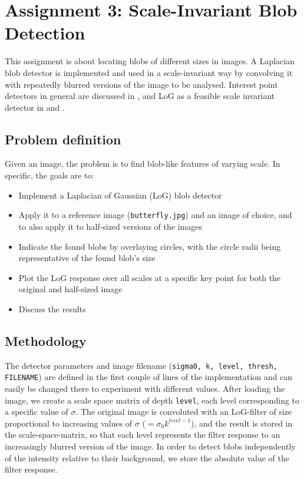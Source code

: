 \section{Assignment 3: Scale-Invariant Blob Detection}
\label{sec:assignment3}

This assignment is about locating blobs of different sizes in images. A Laplacian blob detector is implemented and used in a scale-invariant way by convolving it with repeatedly blurred versions of the image to be analysed.
Interest point detectors in general are discussed in \cite{Szeliski}, and LoG as a feasible scale invariant detector in \cite{Lindeberg} and \cite{Mikolajczyk}.

\subsection{Problem definition}

Given an image, the problem is to find blob-like features of varying scale. In specific, the goals are to:
\begin{itemize}[noitemsep]
\item Implement a Laplacian of Gaussian (LoG) blob detector
\item Apply it to a reference image (\texttt{butterfly.jpg}) and an image of choice, and to also apply it to half-sized versions of the images
\item Indicate the found blobs by overlaying circles, with the circle radii being representative of the found blob's size
\item Plot the LoG response over all scales at a specific key point for both the original and half-sized image
\item Discuss the results
\end{itemize}

\subsection{Methodology}
\label{sec:a3:methodology}

The detector parameters and image filename (\texttt{sigma0, k, level, thresh, FILENAME}) are defined in the first couple of lines of the implementation and can easily be changed there to experiment with different values.
After loading the image, we create a scale space matrix of depth \texttt{level}, each level corresponding to a specific value of $\sigma$.
The original image is convoluted with an LoG-filter of size proportional to increasing values of $\sigma$ ($= \sigma_0 k^{level-1}$), and the result is stored in the scale-space-matrix, so that each level represents the filter response to an increasingly blurred version of the image.
In order to detect blobs independently of the intensity relative to their background, we store the absolute value of the filter response.


